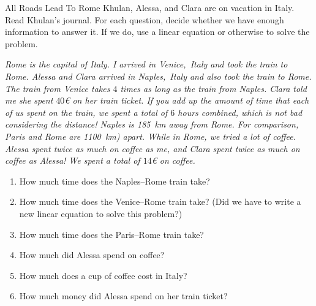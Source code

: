 \documentclass[12pt,letterpaper]{article}
\begin{document}
\begin{problem}{All Roads Lead To Rome}
  Khulan, Alessa, and Clara are on vacation in Italy. Read Khulan's journal. For each
  question, decide whether we have enough information to answer it. If we do, use a linear
  equation or otherwise to solve the problem.

  \textit{Rome is the capital of Italy. I arrived in Venice,~Italy and took the train to
  Rome. Alessa and Clara arrived in Naples,~Italy and also took the train to Rome. The train
  from Venice takes \(4\) times as long as the train from Naples. Clara told me she spent
  \(40\)€ on her train ticket. If you add up the amount of time that each of us spent on the
  train, we spent a total of \(6\) hours combined, which is not bad considering the
  distance! Naples is \SI{185}{\kilo\metre} away from Rome. For comparison, Paris and Rome
  are \SI{1100}{\kilo\meter}) apart. While in Rome, we tried a lot of coffee. Alessa spent
  twice as much on coffee as me, and Clara spent twice as much on coffee as Alessa! We spent
  a total of \(14\)€ on coffee.}

  \begin{enumerate}
    \item How much time does the Naples--Rome train take?
    \item How much time does the Venice--Rome train take? (Did we have to write a new linear
    equation to solve this problem?)
    \item How much time does the Paris--Rome train take?
    \item How much did Alessa spend on coffee?
    \item How much does a cup of coffee cost in Italy?
    \item How much money did Alessa spend on her train ticket?
  \end{enumerate}
\end{problem}
\end{document}
